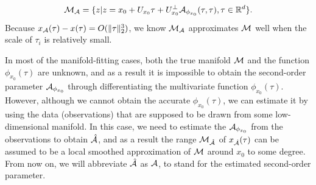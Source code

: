 \documentclass{article}
\theoremstyle{remark}
\begin{document}
\begin{equation}\label{M_a}
{\cal M_A} = \{ z| z =  x_0+ U_{x_0} \tau + U_{x_0}^{\perp} {\cal A}_{\phi_{x_0}}(\tau, \tau), \tau \in {\mathbb R}^d\}.
\end{equation}
Because  $x_{\cal A}(\tau)-x(\tau) = O(\|\tau\|_2^3)$, we know ${\cal M_A}$ approximates $\cal M$ well when the scale of  $\tau_i$ is relatively small.

In most of the manifold-fitting cases, both the true manifold $\cal M$ and the function $\phi_{x_0}(\tau)$ are unknown, and as a result it is impossible to obtain the second-order parameter ${\cal A}_{\phi_{x_0}}$ through differentiating the multivariate function $\phi_{x_0}(\tau)$.
However, although we cannot obtain the accurate $\phi_{x_0}(\tau)$, we can estimate it by using the data (observations) that are supposed to be drawn from some low-dimensional manifold. In this case, we need to estimate the ${\cal A}_{\phi_{x_0}}$ from the observations to obtain $\hat{\cal A}$, and as a result the range $\cal M_{\hat{\cal A}}$ of $x_{\hat{\cal A}}(\tau)$ can be assumed to be a local smoothed approximation of $\cal M$ around $x_0$ to some degree.
From now on, we will abbreviate $\hat{\cal A}$ as ${\cal A}$, to stand for the estimated second-order parameter.
\end{document}
